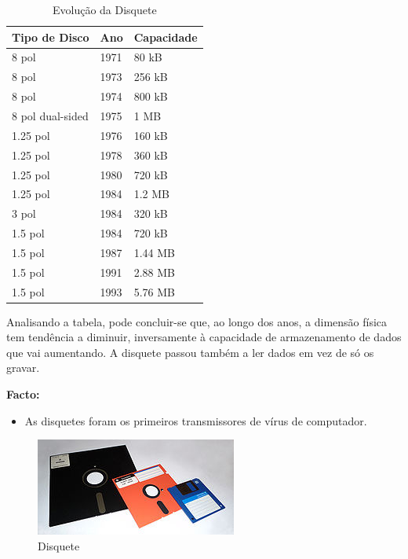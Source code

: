 \documentclass{report}
\begin{document}
	\begin{table}[h]
		\centering
		\caption{Evolução da Disquete}
		\vspace{2mm}
		\label{Tabela de Disquete}
		\begin{tabular}{|l|l|l|}
		\hline
		\textbf{Tipo de Disco} & \textbf{Ano} & \textbf{Capacidade} \\ \hline
		8 pol            & 1971 & 80 kB   \\ \hline
		8 pol            & 1973 & 256 kB  \\ \hline
		8 pol            & 1974 & 800 kB  \\ \hline
		8 pol dual-sided & 1975 & 1 MB    \\ \hline
		1.25 pol         & 1976 & 160 kB  \\ \hline
		1.25 pol         & 1978 & 360 kB  \\ \hline
		1.25 pol         & 1980 & 720 kB  \\ \hline
		1.25 pol         & 1984 & 1.2 MB  \\ \hline
		3 pol            & 1984 & 320 kB  \\ \hline
		1.5 pol          & 1984 & 720 kB  \\ \hline
		1.5 pol          & 1987 & 1.44 MB \\ \hline
		1.5 pol          & 1991 & 2.88 MB \\ \hline
		1.5 pol          & 1993 & 5.76 MB \\ \hline
		
		\end{tabular}
		\end{table}		
 
	Analisando a tabela, pode concluir-se que, ao longo dos anos, a dimensão física tem tendência a diminuir, inversamente à capacidade de armazenamento de dados que vai aumentando. A disquete passou também a ler dados em vez de só os gravar. 

	\textbf{Facto:}	
		\begin{itemize}
		 	\item As disquetes foram os primeiros transmissores de vírus de computador. 
	 	\end{itemize}
	
	
	\begin{figure} [h]
		\centering
		\includegraphics[scale=1]{disquete.jpg}
		\caption{Disquete}
	\end{figure}
	
\end{document}
